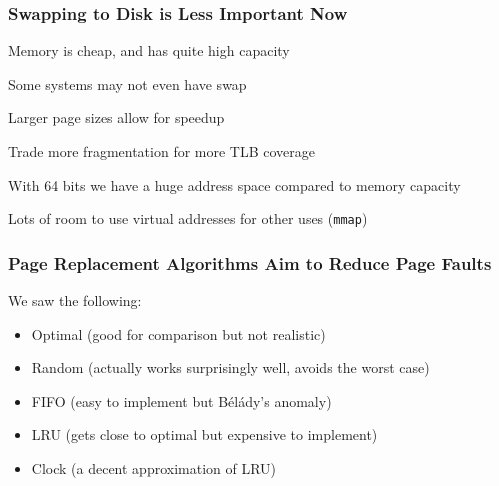   \begin{frame}
    \frametitle{Swapping to Disk is Less Important Now}

    Memory is cheap, and has quite high capacity

    \hspace{2em} Some systems may not even have swap

    \vspace{2em}

    Larger page sizes allow for speedup

    \hspace{2em} Trade more fragmentation for more TLB coverage

    \vspace{2em}

    With 64 bits we have a huge address space compared to memory capacity

    \hspace{2em} Lots of room to use virtual addresses for other uses
    (\texttt{mmap})
  \end{frame}

  \begin{frame}
    \frametitle{Page Replacement Algorithms Aim to Reduce Page Faults}

    We saw the following:
    \begin{itemize}
      \item Optimal (good for comparison but not realistic)
      \item Random (actually works surprisingly well, avoids the worst case)
      \item FIFO (easy to implement but Bélády's anomaly)
      \item LRU (gets close to optimal but expensive to implement)
      \item Clock (a decent approximation of LRU)
    \end{itemize}
  \end{frame}

